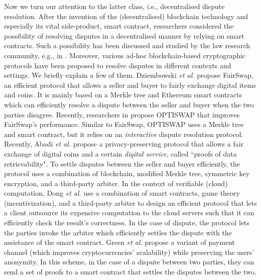 Now we turn our attention to the latter class, i.e., decentralised dispute resolution. After the invention of the (decentralised) blockchain technology and  especially its vital side-product, smart contract, researchers considered  the possibility of resolving disputes in a decentralised manner by relying on smart contracts. Such a possibility has been discussed and studied by the law research community, e.g., in \cite{buchwald2019smart,ortolani2016self,ortolani2019impact}. Moreover,  various ad-hoc blockchain-based cryptographic protocols have been  proposed to resolve disputes in different contexts and settings. We briefly explain a few of them. Dziembowski \textit{et al.}  \cite{DziembowskiEF18} propose FairSwap, an efficient protocol that allows a seller and buyer to fairly exchange  digital items  and  coins. It is mainly based on a Merkle tree and Ethereum smart contracts which can efficiently resolve a dispute between the seller and buyer  when the two parties disagree. Recently, researchers in  \cite{EckeyFS20} propose OPTISWAP that improves FairSwap’s performance. Similar to FairSwap, OPTISWAP uses a Merkle tree and smart contract, but  it relies on an \emph{interactive} dispute resolution protocol. Recently, Abadi \textit{et al.} \cite{AbadiMZ21a} propose a privacy-preserving protocol that allows a  fair exchange of digital coins and a certain \emph{digital service}, called ``proofs of data retrievability". To settle disputes between the seller and buyer efficiently, the protocol uses a combination of   blockchain, modified Merkle tree, symmetric key encryption, and a  third-party arbiter. In the context of verifiable (cloud) computation, Dong \textit{et al.} \cite{DongWAMM17} use a combination of smart contracts, game theory (incentivization), and a   third-party arbiter to design an efficient protocol  that lets a client outsource its expensive computation to the cloud servers such that it can efficiently check the result's correctness. In the case of dispute, the protocol lets the parties  invoke the  arbiter which efficiently settles the dispute with the assistance of the smart contract. Green \textit{et al.} \cite{Bolt} propose a variant  of  payment channel \cite{Lightning-Network} (which improves cryptocurrencies' scalability) while preserving the users' anonymity. In this scheme, in the case of a dispute between two parties, they can send a set of proofs to a smart contract that settles the disputes between the two. 



 

